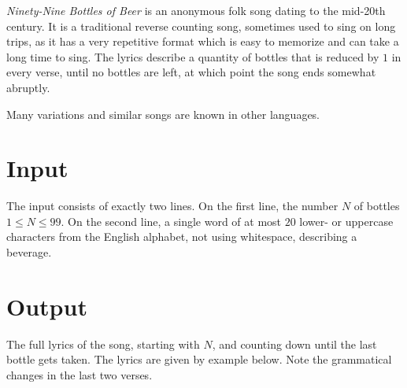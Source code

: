 

\emph{Ninety-Nine Bottles of Beer} is an anonymous folk song dating to the mid-20th century.
It is a traditional reverse counting song, sometimes used to sing on long trips, as it has a very repetitive format which is easy to memorize and can take a long time to sing.
The lyrics describe a quantity of bottles that is reduced by $1$ in every verse, until no bottles are left, at which point the song ends somewhat abruptly.

Many variations and similar songs are known in other languages.

\section*{Input}

The input consists of exactly two lines.
On the first line, the number $N$ of bottles $1\leq N\leq 99$.
On the second line, a single word of at most $20$ lower- or uppercase characters from the English alphabet, not using whitespace, describing a beverage.

\section*{Output}

The full lyrics of the song, starting with $N$, and counting down until the last bottle gets taken.
The lyrics are given by example below.
Note the grammatical changes in the last two verses.
